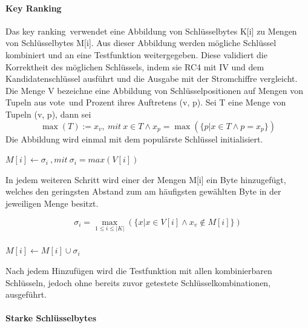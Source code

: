 \documentclass[10pt,a4paper]{article}
\begin{document}
\paragraph{Key Ranking}
Das \glqq key ranking\grqq\ verwendet eine Abbildung von Schlüsselbytes K[i] zu Mengen von Schlüsselbytes M[i]. Aus dieser Abbildung werden mögliche Schlüssel kombiniert und an eine Testfunktion weitergegeben. Diese validiert die Korrektheit des möglichen Schlüssels, indem sie RC4 mit IV und dem Kandidatenschlüssel ausführt und die Ausgabe mit der Stromchiffre vergleicht.
\vspace{0.5em}
\\Die Menge V bezeichne eine Abbildung von Schlüsselpositionen auf Mengen von Tupeln aus \glqq vote\grqq\ und Prozent ihres Auftretens (v, p). Sei T eine Menge von Tupeln (v, p), dann sei
\[ \max(T) := x_v,\ mit\ x \in T \wedge x_p = \max (\{p | x \in T \wedge p=x_p\}) \]
Die Abbildung wird einmal mit dem populärste Schlüssel initialisiert.\\
\begin{center}
$ M[i] \leftarrow \sigma_i\ ,mit\ \sigma_i = max(V[i])$
\end{center}
In jedem weiteren Schritt wird einer der Mengen M[i] ein Byte hinzugefügt, welches den geringsten Abstand zum am häufigsten gewählten Byte in der jeweiligen Menge besitzt.
\begin{center}
\[ \sigma_i = \max_{1 \leq i \leq |K|} (\{x | x \in V[i] \wedge x_v \notin M[i]\}) \]
\\\vspace{0.8em}
$ M[i] \leftarrow M[i] \cup \sigma_i$
\end{center}
Nach jedem Hinzufügen wird die Testfunktion mit allen kombinierbaren Schlüsseln, jedoch ohne bereits zuvor getestete Schlüsselkombinationen, ausgeführt. 
\paragraph{Starke Schlüsselbytes}
\end{document}
